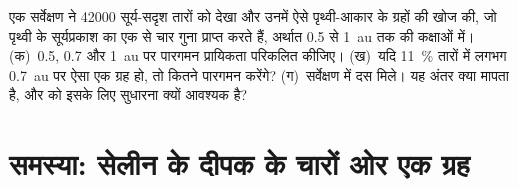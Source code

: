 \begin{exercise}[$\star\star\star$]\label{exo:b3:exoplanets:12}
एक सर्वेक्षण ने \num{42000} सूर्य-सदृश तारों को देखा और उनमें ऐसे पृथ्वी-आकार के
ग्रहों की खोज की, जो पृथ्वी के सूर्यप्रकाश का एक से चार गुना प्राप्त करते हैं, अर्थात
0.5 से \qty{1}{au} तक की कक्षाओं में। (क)~0.5, 0.7 और \qty{1}{au} पर पारगमन
प्रायिकता परिकलित कीजिए। (ख)~यदि \qty{11}{\percent} तारों में
लगभग \qty{0.7}{au} पर ऐसा एक ग्रह हो, तो कितने पारगमन करेंगे?
(ग)~सर्वेक्षण में दस मिले। यह अंतर क्या मापता है, और
 को इसके लिए सुधारना क्यों आवश्यक है?
\end{exercise}

\section{समस्या: सेलीन के दीपक के चारों ओर एक ग्रह}

